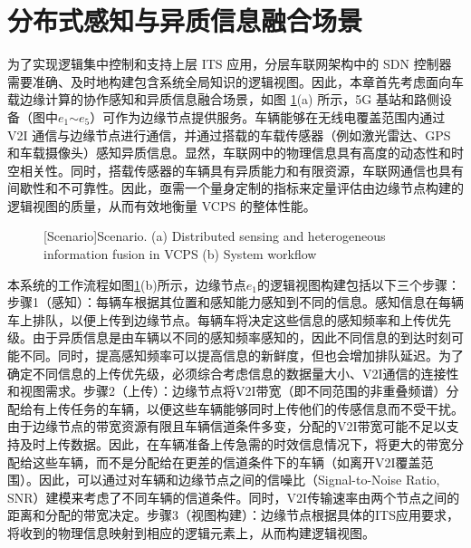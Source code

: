 \section{分布式感知与异质信息融合场景}\label{section 2-3}

为了实现逻辑集中控制和支持上层 ITS 应用，分层车联网架构中的 SDN 控制器需要准确、及时地构建包含系统全局知识的逻辑视图。因此，本章首先考虑面向车载边缘计算的协作感知和异质信息融合场景，如图 \ref{fig 2-2}(a) 所示，5G 基站和路侧设备（图中$e_1$$\sim$$e_5$）可作为边缘节点提供服务。车辆能够在无线电覆盖范围内通过 V2I 通信与边缘节点进行通信，并通过搭载的车载传感器（例如激光雷达、GPS 和车载摄像头）感知异质信息。显然，车联网中的物理信息具有高度的动态性和时空相关性。同时，搭载传感器的车辆具有异质能力和有限资源，车联网通信也具有间歇性和不可靠性。因此，亟需一个量身定制的指标来定量评估由边缘节点构建的逻辑视图的质量，从而有效地衡量 VCPS 的整体性能。

\begin{figure}[h]
     \centering
     [Scenario]{Scenario. (a) Distributed sensing and heterogeneous information fusion in VCPS (b) System workflow}
     \label{fig 2-2}
\end{figure}

本系统的工作流程如图\ref{fig 2-2}(b)所示，边缘节点$e_1$的逻辑视图构建包括以下三个步骤：步骤1（感知）：每辆车根据其位置和感知能力感知到不同的信息。感知信息在每辆车上排队，以便上传到边缘节点。每辆车将决定这些信息的感知频率和上传优先级。由于异质信息是由车辆以不同的感知频率感知的，因此不同信息的到达时刻可能不同。同时，提高感知频率可以提高信息的新鲜度，但也会增加排队延迟。为了确定不同信息的上传优先级，必须综合考虑信息的数据量大小、V2I通信的连接性和视图需求。步骤2（上传）：边缘节点将V2I带宽（即不同范围的非重叠频谱）分配给有上传任务的车辆，以便这些车辆能够同时上传他们的传感信息而不受干扰。由于边缘节点的带宽资源有限且车辆信道条件多变，分配的V2I带宽可能不足以支持及时上传数据。因此，在车辆准备上传急需的时效信息情况下，将更大的带宽分配给这些车辆，而不是分配给在更差的信道条件下的车辆（如离开V2I覆盖范围）。因此，可以通过对车辆和边缘节点之间的信噪比（Signal-to-Noise Ratio, SNR）建模来考虑了不同车辆的信道条件。同时，V2I传输速率由两个节点之间的距离和分配的带宽决定。步骤3（视图构建）：边缘节点根据具体的ITS应用要求，将收到的物理信息映射到相应的逻辑元素上，从而构建逻辑视图。

